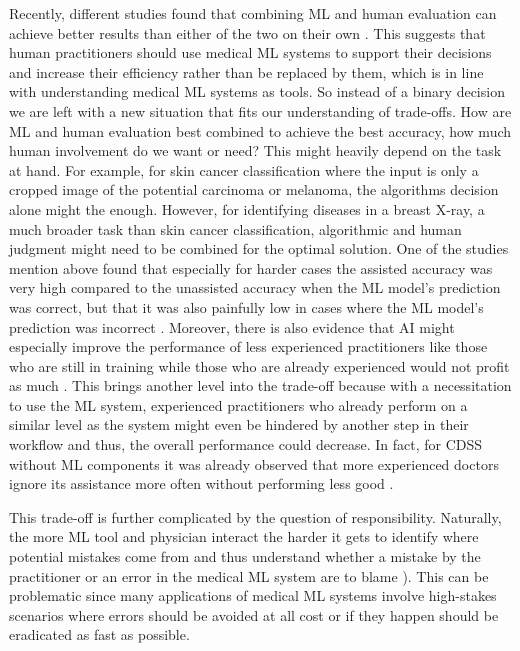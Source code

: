Recently, different studies found that combining ML and human evaluation can achieve better results than either of the two on their own \cite{rajpurkar2022ai, kiani2020impact, topol2019high, steiner2018impact}. This suggests that human practitioners should use medical ML systems to support their decisions and increase their efficiency rather than be replaced by them, which is in line with understanding medical ML systems as tools. So instead of a binary decision we are left with a new situation that fits our understanding of trade-offs. How are ML and human evaluation best combined to achieve the best accuracy, how much human involvement do we want or need? This might heavily depend on the task at hand. For example, for skin cancer classification where the input is only a cropped image of the potential carcinoma or melanoma, the algorithms decision alone might the enough. However, for identifying diseases in a breast X-ray, a much broader task than skin cancer classification, algorithmic and human judgment might need to be combined for the optimal solution.  One of the studies mention above found that especially for harder cases the assisted accuracy was very high compared to the unassisted accuracy when the ML model's prediction was correct, but that it was also painfully low in cases where the ML model's prediction was incorrect \cite{kiani2020impact}. Moreover, there is also evidence that AI might especially improve the performance of less experienced practitioners like those who are still in training while those who are already experienced would not profit as much \cite{rajpurkar2022ai}. This brings another level into the trade-off because with a necessitation to use the ML system, experienced practitioners who already perform on a similar level as the system might even be hindered by another step in their workflow and thus, the overall performance could decrease. In fact, for CDSS without ML components it was already observed that more experienced doctors ignore its assistance more often without performing less good \cite{sutton2020overview}.

This trade-off is further complicated by the question of responsibility. Naturally, the more ML tool and physician interact the harder it gets to identify where potential mistakes come from and thus understand whether a mistake by the practitioner or an error in the medical ML system are to blame \cite{horgan2019artificial}). This can be problematic since many applications of medical ML systems involve high-stakes scenarios where errors should be avoided at all cost or if they happen should be eradicated as fast as possible.

